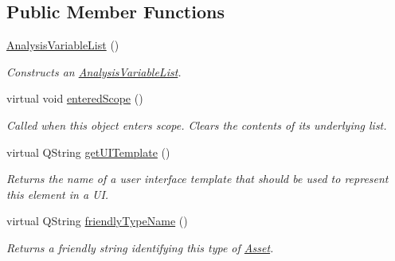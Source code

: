 \subsection*{Public Member Functions}
\begin{DoxyCompactItemize}
\item 
\hyperlink{class_picto_1_1_analysis_variable_list_ab0fd4aa93e87ee2e5932407d4d298d18}{Analysis\-Variable\-List} ()
\begin{DoxyCompactList}\small\item\em Constructs an \hyperlink{class_picto_1_1_analysis_variable_list}{Analysis\-Variable\-List}. \end{DoxyCompactList}\item 
\hypertarget{class_picto_1_1_analysis_variable_list_a2e4352c5204085292ad70fa22512a432}{virtual void \hyperlink{class_picto_1_1_analysis_variable_list_a2e4352c5204085292ad70fa22512a432}{entered\-Scope} ()}\label{class_picto_1_1_analysis_variable_list_a2e4352c5204085292ad70fa22512a432}

\begin{DoxyCompactList}\small\item\em Called when this object enters scope. Clears the contents of its underlying list. \end{DoxyCompactList}\item 
\hypertarget{class_picto_1_1_analysis_variable_list_ae49a4d524449bab79bb2750f6a823cf7}{virtual Q\-String \hyperlink{class_picto_1_1_analysis_variable_list_ae49a4d524449bab79bb2750f6a823cf7}{get\-U\-I\-Template} ()}\label{class_picto_1_1_analysis_variable_list_ae49a4d524449bab79bb2750f6a823cf7}

\begin{DoxyCompactList}\small\item\em Returns the name of a user interface template that should be used to represent this element in a U\-I. \end{DoxyCompactList}\item 
virtual Q\-String \hyperlink{class_picto_1_1_analysis_variable_list_a66330dfe781d4cfba0cc30c11d7824f2}{friendly\-Type\-Name} ()
\begin{DoxyCompactList}\small\item\em Returns a friendly string identifying this type of \hyperlink{class_picto_1_1_asset}{Asset}. \end{DoxyCompactList}\end{DoxyCompactItemize}
